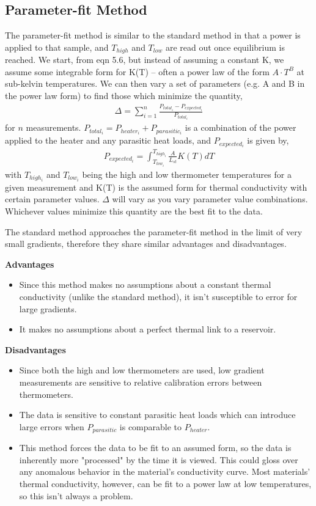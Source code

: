 \documentclass{report}
\begin{document}
\subsection{Parameter-fit Method}
The parameter-fit method is similar to the standard method in that a power is applied to that sample, and $T_{high}$ and $T_{low}$ are read out once equilibrium is reached. We start, from eqn 5.6, but instead of assuming a constant K, we assume some integrable form for K(T) -- often a power law of the form $A \cdot T^B$ at sub-kelvin temperatures. We can then vary a set of parameters (e.g. A and B in the power law form) to find those which minimize the quantity,
\begin{eqnarray}
\Delta = \sum_{i = 1}^{n} \frac{P_{total_i} - P_{expected_i}}{P_{total_i}}
\end{eqnarray}
for $n$ measurements. $P_{total_i} = P_{heater_i} + P_{parasitic_i}$ is a combination of the power applied to the heater and any parasitic heat loads, and $P_{expected_i}$ is given by,
\begin{eqnarray}
P_{expected_i} = \int_{T_{low_i}}^{T_{high_i}} \frac{A}{L_{st}}K(T)dT
\end{eqnarray}
with $T_{high_i}$ and $T_{low_i}$ being the high and low thermometer temperatures for a given measurement and K(T) is the assumed form for thermal conductivity with certain parameter values. $\Delta$ will vary as you vary parameter value combinations. Whichever values minimize this quantity are the best fit to the data.

The standard method approaches the parameter-fit method in the limit of very small gradients, therefore they share similar advantages and disadvantages.

\bigskip

\textbf{Advantages}
\begin{itemize}
\item Since this method makes no assumptions about a constant thermal conductivity (unlike the standard method), it isn't susceptible to error for large gradients.
\item It makes no assumptions about a perfect thermal link to a reservoir.
\end{itemize}

\textbf{Disadvantages}
\begin{itemize}
\item Since both the high and low thermometers are used, low gradient measurements are sensitive to relative calibration errors between thermometers.
\item The data is sensitive to constant parasitic heat loads which can introduce large errors when $P_{parasitic}$ is comparable to $P_{heater}$.
\item This method forces the data to be fit to an assumed form, so the data is inherently more "processed" by the time it is viewed. This could gloss over any anomalous behavior in the material's conductivity curve. Most materials' thermal conductivity, however, can be fit to a power law at low temperatures, so this isn't always a problem.
\end{itemize}
\end{document}
